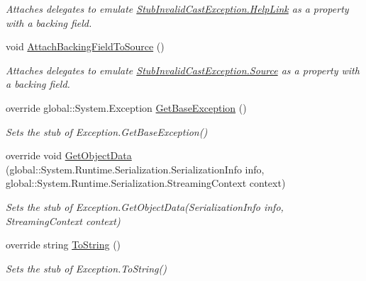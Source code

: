 \begin{DoxyCompactItemize}
\begin{DoxyCompactList}\small\item\em Attaches delegates to emulate \hyperlink{class_system_1_1_fakes_1_1_stub_invalid_cast_exception_abc777d459af519defe99b0e3ed25032b}{Stub\-Invalid\-Cast\-Exception.\-Help\-Link} as a property with a backing field.\end{DoxyCompactList}\item 
void \hyperlink{class_system_1_1_fakes_1_1_stub_invalid_cast_exception_a63d3014b5c5b71ee4a93606c9fdd6824}{Attach\-Backing\-Field\-To\-Source} ()
\begin{DoxyCompactList}\small\item\em Attaches delegates to emulate \hyperlink{class_system_1_1_fakes_1_1_stub_invalid_cast_exception_acc8cf93e3a1647585132bb0add3cec29}{Stub\-Invalid\-Cast\-Exception.\-Source} as a property with a backing field.\end{DoxyCompactList}\item 
override global\-::\-System.\-Exception \hyperlink{class_system_1_1_fakes_1_1_stub_invalid_cast_exception_a419bfc5dc7a7f9975da7773dca94430c}{Get\-Base\-Exception} ()
\begin{DoxyCompactList}\small\item\em Sets the stub of Exception.\-Get\-Base\-Exception()\end{DoxyCompactList}\item 
override void \hyperlink{class_system_1_1_fakes_1_1_stub_invalid_cast_exception_acf3ad970f7bb82c2a7fd2d61e69279da}{Get\-Object\-Data} (global\-::\-System.\-Runtime.\-Serialization.\-Serialization\-Info info, global\-::\-System.\-Runtime.\-Serialization.\-Streaming\-Context context)
\begin{DoxyCompactList}\small\item\em Sets the stub of Exception.\-Get\-Object\-Data(\-Serialization\-Info info, Streaming\-Context context)\end{DoxyCompactList}\item 
override string \hyperlink{class_system_1_1_fakes_1_1_stub_invalid_cast_exception_a2e7e5f9e80257e7659e88db32bc21c77}{To\-String} ()
\begin{DoxyCompactList}\small\item\em Sets the stub of Exception.\-To\-String()\end{DoxyCompactList}\end{DoxyCompactItemize}

